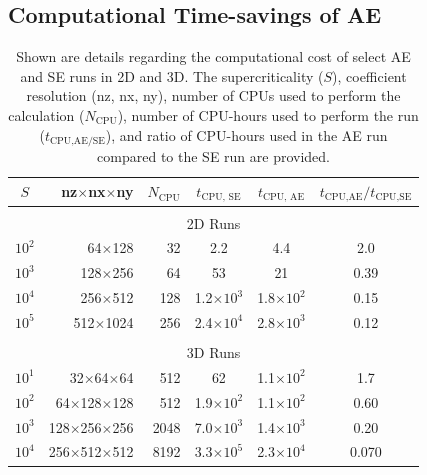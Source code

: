 \subsection{Computational Time-savings of AE}
\label{sec:abo18_speedups}

\begin{table}[b!]
\caption[Computational cost of AE and SE]
{
	Shown are details regarding the computational cost of select AE and SE runs in 2D and 3D. 
	The supercriticality ($S$), coefficient resolution (nz, nx, ny), number of CPUs used to perform the calculation ($N_{\text{CPU}}$), number of CPU-hours used to perform the run ($t_{\text{CPU,AE/SE}}$), and ratio of CPU-hours used in the AE run compared to the SE run are provided.
}
\setlength{\tabcolsep}{12pt}
\label{table:speed}
\begin{center}
\begin{tabular}{ c r r c c c }
\hline																	
$S$	&	nz$\times$nx$\times$ny	&	$N_{\text{CPU}}$	&	
$t_{\text{CPU, SE}}$ & $t_{\text{CPU, AE}}$ &$t_{\text{CPU,AE}}/t_{\text{CPU,SE}}$\\
\hline \hline \multicolumn{6}{c}{\vspace{-0.2cm}}\\
\multicolumn{6}{c}{\vspace{0.1cm}2D Runs} \\
\hline
$10^2$	&	64$\times$128	&	32    &  2.2              & 4.4               &     2.0  \\
$10^3$	&	128$\times$256	&	64    &  53               & 21                &     0.39 \\
$10^4$	&	256$\times$512	&	128   &  1.2$\times 10^3$ & 1.8$\times 10^2$  &     0.15  \\
$10^5$	&	512$\times$1024&	256   &  2.4$\times 10^4$ & 2.8$\times 10^3$  &     0.12 \\
\hline \hline \multicolumn{6}{c}{\vspace{-0.2cm}}\\
\multicolumn{6}{c}{\vspace{0.1cm}3D Runs} \\
\hline
$10^1$	&	32$\times$64$\times$64	    & 512       &   62                 &        1.1$\times 10^2$   & 1.7\\
$10^2$	&	64$\times$128$\times$128	& 512       &   1.9$\times 10^2$   &        1.1$\times 10^2$   & 0.60 \\
$10^3$	&	128$\times$256$\times$256	& 2048      &   7.0$\times 10^3$   &        1.4$\times 10^3$   & 0.20 \\
$10^4$	&	256$\times$512$\times$512	& 8192      &   3.3$\times 10^5$   &        2.3$\times 10^4$   & 0.070\\
\hline																	
\end{tabular}
\end{center}
\end{table}


